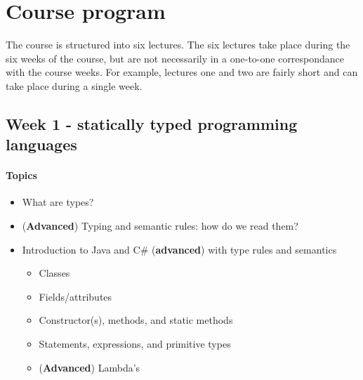 \section{Course program}
	The course is structured into six lectures. The six lectures take place during the six weeks of the course, but are not necessarily in a one-to-one correspondance with the course weeks. For example, lectures one and two are fairly short and can take place during a single week.

		\subsection{Week 1 - statically typed programming languages}

			\paragraph*{Topics}

				\begin{itemize}
					\item What are types?
					\item (\textbf{Advanced}) Typing and semantic rules: how do we read them?
					\item Introduction to Java and C\# (\textbf{advanced}) with type rules and semantics
					\begin{itemize}
						\item Classes
						\item Fields/attributes
						\item Constructor(s), methods, and static methods
						\item Statements, expressions, and primitive types
						\item (\textbf{Advanced}) Lambda's
					\end{itemize}
				\end{itemize}

